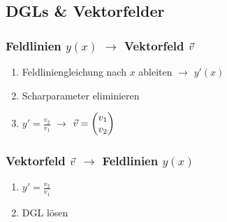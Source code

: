 \subsection{DGLs \& Vektorfelder}
    \vspace{0.5em}
    \subsubsection{Feldlinien \texorpdfstring{$y(x)$}{y(x)} \texorpdfstring{$\to$}{->} Vektorfeld \texorpdfstring{$\vec{v}$}{v}}
        \begin{enumerate}
            \item Feldliniengleichung nach $x$ ableiten $\to$ $y'(x)$
            \item Scharparameter eliminieren
            \item $\displaystyle y' = \frac{v_2}{v_1}$ $\to$ $\vec{v} = \begin{pmatrix} v_1\\v_2 \end{pmatrix}$
        \end{enumerate}
    \subsubsection{Vektorfeld \texorpdfstring{$\vec{v}$}{v} \texorpdfstring{$\to$}{->} Feldlinien \texorpdfstring{$y(x)$}{y(x)}}
        \vspace{0.5em}
        \begin{enumerate}
            \item $\displaystyle y' = \frac{v_2}{v_1}$
            \item DGL lösen
        \end{enumerate}